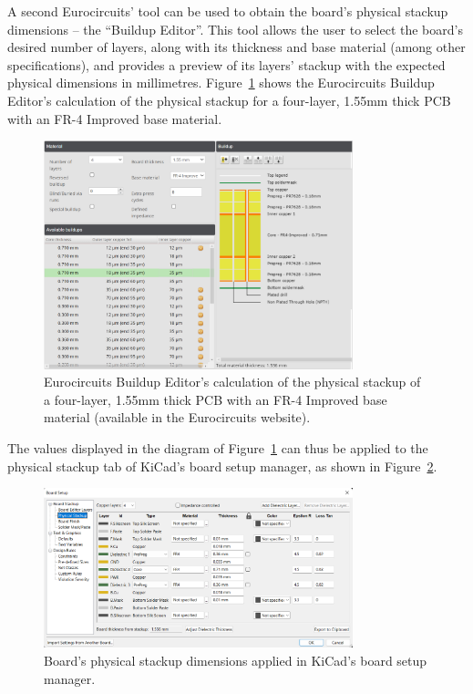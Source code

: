A second Eurocircuits' tool can be used to obtain the board's physical stackup dimensions -- the ``Buildup Editor''. This tool allows the user to select the board's desired number of layers, along with its thickness and base material (among other specifications), and provides a preview of its layers' stackup with the expected physical dimensions in millimetres. Figure~\ref{fig:buildup_4layer} shows the Eurocircuits Buildup Editor's calculation of the physical stackup for a four-layer, 1.55mm thick PCB with an FR-4 Improved base material.

\begin{figure}[h]
	\centering
	\includegraphics[width=0.8\textwidth]{Chapters/Figures/chapter5/buildup_4layer.png}
	\caption{Eurocircuits Buildup Editor's calculation of the physical stackup of a four-layer, 1.55mm thick PCB with an FR-4 Improved base material (available in the Eurocircuits website).}
	\label{fig:buildup_4layer}
\end{figure}

\noindent The values displayed in the diagram of Figure~\ref{fig:buildup_4layer} can thus be applied to the physical stackup tab of KiCad's board setup manager, as shown in Figure~\ref{fig:KiCad_buildup_4layer}.

\begin{figure}[h]
	\centering
	\includegraphics[width=0.8\textwidth]{Chapters/Figures/chapter5/KiCad_buildup_4layer.png}
	\caption{Board's physical stackup dimensions applied in KiCad's board setup manager.}
	\label{fig:KiCad_buildup_4layer}
\end{figure}

